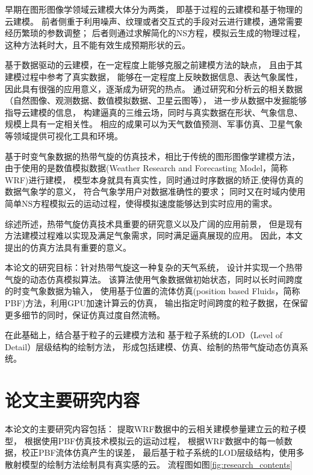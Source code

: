 早期在图形图像学领域云建模大体分为两类，
即基于过程的云建模和基于物理的云建模。
前者侧重于利用噪声、纹理或者交互式的手段对云进行建模，通常需要经历繁琐的参数调整；
后者则通过求解简化的NS方程，模拟云生成的物理过程，
这种方法耗时大，且不能有效生成预期形状的云。

基于数据驱动的云建模，在一定程度上能够克服之前建模方法的缺点，
且由于其建模过程中参考了真实数据，
能够在一定程度上反映数据信息、表达气象属性，因此具有很强的应用意义，逐渐成为研究的热点。
通过研究和分析云的相关数据（自然图像、观测数据、数值模拟数据、卫星云图等），
进一步从数据中发掘能够指导云建模的信息，
构建逼真的三维云场，同时与真实数据在形状、气象信息、规模上具有一定相关性。
相应的成果可以为天气数值预测、军事仿真、卫星气象等领域提供可视化工具和环境。

基于时变气象数据的热带气旋的仿真技术，相比于传统的图形图像学建模方法，
由于使用的是数值模拟数据(Weather Research and Forecasting Model，简称WRF)进行建模，
模型本身就具有真实性，同时通过时序数据的矫正,使得仿真的数据气象学的意义，
符合气象学用户对数据准确性的要求；
同时又在时域内使用简单NS方程模拟云的运动过程，使得模拟速度能够达到实时应用的需求。

综述所述，热带气旋仿真技术具重要的研究意义以及广阔的应用前景，
但是现有方法建模过程难以实现及满足气象需求，同时满足逼真展现的应用。
因此，本文提出的仿真方法具有重要的意义。

本论文的研究目标：针对热带气旋这一种复杂的天气系统，
设计并实现一个热带气旋的动态仿真模拟算法。 
该算法使用气象数据做初始状态，同时以长时间跨度的时变气象数据为输入，
使用基于位置的流体仿真(position based Fluids，简称PBF)方法，利用GPU加速计算云的仿真，
输出指定时间跨度的粒子数据，在保留更多细节的同时，保证仿真过度自然流畅。

在此基础上，结合基于粒子的云建模方法和
基于粒子系统的LOD（Level of Detail）层级结构的绘制方法，
形成包括建模、仿真、绘制的热带气旋动态仿真系统。

\section{论文主要研究内容}

本论文的主要研究内容包括：
提取WRF数据中的云相关建模参量建立云的粒子模型，
根据使用PBF仿真技术模拟云的运动过程，
根据WRF数据中的每一帧数据，校正PBF流体仿真产生的误差，
最后基于粒子系统的LOD层级结构，使用多散射模型的绘制方法绘制具有真实感的云。
流程图如图\ref{fig:research_contents}

